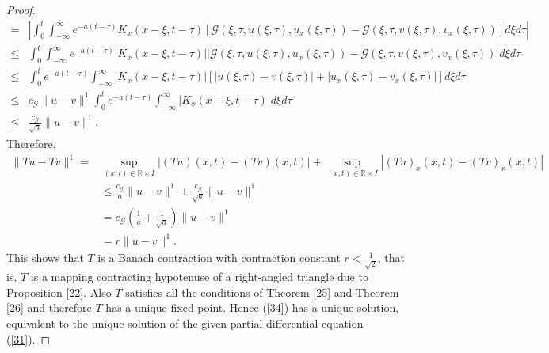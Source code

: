 \documentclass[11pt,reqno,a4paper]{amsart}
\theoremstyle{plain}
\theoremstyle{definition}
\theoremstyle{remark}
\numberwithin{equation}{section}
\begin{document}
\begin{proof}
\begin{align}
=&\left\lvert\int_0^t \int_{-\infty}^\infty e^{-a(t-\tau)} K_x(x-\xi,t-\tau)[\mathcal{G}(\xi,\tau,u(\xi,\tau),u_x(\xi,\tau))-\mathcal{G}(\xi,\tau,v(\xi,\tau),v_x(\xi,\tau))]d\xi d\tau\right\rvert\nonumber\\
\le & \int_0^t \int_{-\infty}^\infty e^{-a(t-\tau)} |K_x(x-\xi,t-\tau)||\mathcal{G}(\xi,\tau,u(\xi,\tau),u_x(\xi,\tau))-\mathcal{G}(\xi,\tau,v(\xi,\tau),v_x(\xi,\tau))|d\xi d\tau\nonumber\\
\le & \int_0^t e^{-a(t-\tau)} \int_{-\infty}^\infty  |K_x(x-\xi,t-\tau)|[|u(\xi,\tau)-v(\xi,\tau)|+|u_x(\xi,\tau)-v_x(\xi,\tau)|]d\xi d\tau\nonumber\\
\le & c_\mathcal{G} \|u-v\|^1\int_0^t e^{-a(t-\tau)} \int_{-\infty}^\infty  |K_x(x-\xi,t-\tau)|d\xi d\tau\nonumber\\
\le & \frac{c_\mathcal{G}}{\sqrt{a}} \|u-v\|^1.
\end{align}
Therefore,
\begin{align}\label{37}
\|Tu-Tv\|^1=&\sup_{(x,t)\in \mathbb{R}\times I}|(Tu)(x,t)-(Tv)(x,t)|+\sup_{(x,t)\in \mathbb{R}\times I}|(Tu)_x(x,t)-(Tv)_x(x,t)|\nonumber\\
&\le \frac{c_\mathcal{G}}{a} \|u-v\|^1+\frac{c_\mathcal{G}}{\sqrt{a}} \|u-v\|^1\nonumber\\
&=c_\mathcal{G}\left(\frac{1}{a}+\frac{1}{\sqrt{a}}\right)\|u-v\|^1\nonumber\\
&=r \|u-v\|^1.
\end{align}
This shows that $T$ is a Banach contraction with contraction constant $r<\frac{1}{\sqrt{2}}$, that is, $T$ is a mapping contracting hypotenuse of a right-angled triangle due to Proposition \ref{22}. Also $T$ satisfies all the conditions of Theorem \ref{25} and Theorem \ref{26} and therefore $T$ has a unique fixed point. Hence (\ref{34}) has a unique solution, equivalent to the unique solution of the given partial differential equation (\ref{31}).
\end{proof}
\end{document}
